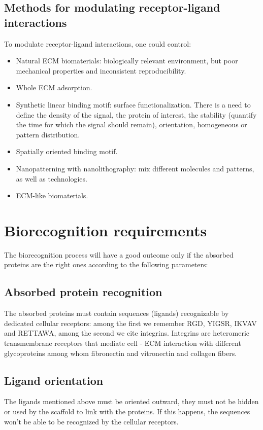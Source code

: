 	\subsection{Methods for modulating receptor-ligand interactions}
	To modulate receptor-ligand interactions, one could control:

	\begin{multicols}{2}
		\begin{itemize}
			\item Natural ECM biomaterials: biologically relevant environment, but poor mechanical properties and inconsistent reproducibility.
			\item Whole ECM adsorption.
			\item Synthetic linear binding motif: surface functionalization.
				There is a need to define the density of the signal, the protein of interest, the stability (quantify the time for which the signal should remain), orientation, homogeneous or pattern distribution.
			\item Spatially oriented binding motif.
			\item Nanopatterning with nanolithography: mix different molecules and patterns, as well as technologies.
			\item ECM-like biomaterials.
		\end{itemize}
	\end{multicols}

\section{Biorecognition requirements}
The biorecognition process will have a good outcome only if the absorbed proteins are the right ones according to the following parameters:

	\subsection{Absorbed protein recognition}
	The absorbed proteins must contain sequences (ligands) recognizable by dedicated cellular receptors: among the first we remember RGD, YIGSR, IKVAV and RETTAWA, among the second we cite integrins.
	Integrins are heteromeric transmembrane receptors that mediate cell - ECM interaction with different glycoproteins among whom fibronectin and vitronectin and collagen fibers.

	\subsection{Ligand orientation}
	The ligands mentioned above must be oriented outward, they must not be hidden or used by the scaffold to link with the proteins.
	If this happens, the sequences won’t be able to be recognized by the cellular receptors.

